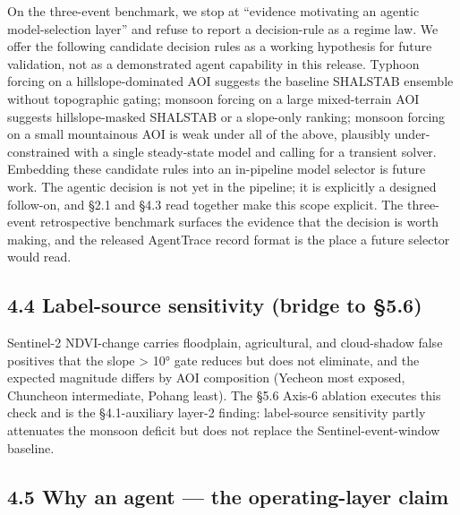 \documentclass[11pt,a4paper]{article}
\begin{document}
On the three-event benchmark, we stop at ``evidence motivating an agentic model-selection layer'' and refuse to report a decision-rule as a regime law. We offer the following candidate decision rules as a working hypothesis for future validation, not as a demonstrated agent capability in this release. Typhoon forcing on a hillslope-dominated AOI suggests the baseline SHALSTAB ensemble without topographic gating; monsoon forcing on a large mixed-terrain AOI suggests hillslope-masked SHALSTAB or a slope-only ranking; monsoon forcing on a small mountainous AOI is weak under all of the above, plausibly under-constrained with a single steady-state model and calling for a transient solver. Embedding these candidate rules into an in-pipeline model selector is future work. The agentic decision is not yet in the pipeline; it is explicitly a designed follow-on, and §2.1 and §4.3 read together make this scope explicit. The three-event retrospective benchmark surfaces the evidence that the decision is worth making, and the released AgentTrace record format is the place a future selector would read.

\subsection{4.4 Label-source sensitivity (bridge to §5.6)}\label{label-source-sensitivity-bridge-to-5.6}

Sentinel-2 NDVI-change carries floodplain, agricultural, and cloud-shadow false positives that the slope \textgreater{} 10° gate reduces but does not eliminate, and the expected magnitude differs by AOI composition (Yecheon most exposed, Chuncheon intermediate, Pohang least). The §5.6 Axis-6 ablation executes this check and is the §4.1-auxiliary layer-2 finding: label-source sensitivity partly attenuates the monsoon deficit but does not replace the Sentinel-event-window baseline.

\subsection{4.5 Why an agent --- the operating-layer claim}\label{why-an-agent-the-operating-layer-claim}
\end{document}
